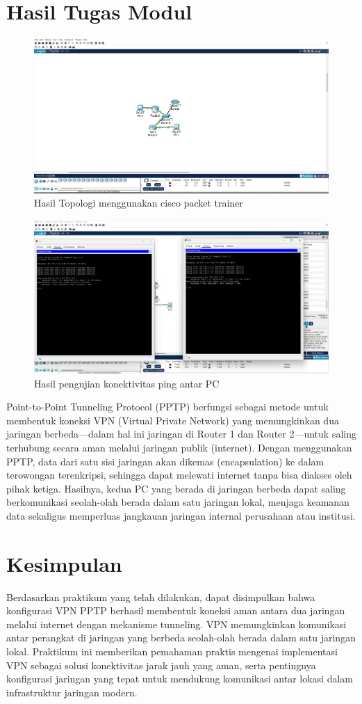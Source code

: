\section{Hasil Tugas Modul}

\begin{figure}[H]
        \centering
        \includegraphics[width=0.5\linewidth]{P1/img/18.png}
        \caption{Hasil Topologi menggunakan cisco packet trainer}
        \label{fig:gambar4}
    \end{figure}
    \begin{figure}[H]
        \centering
        \includegraphics[width=0.5\linewidth]{P1/img/19.png}
        \caption{Hasil pengujian konektivitas ping antar PC}
        \label{fig:gambar4}
    \end{figure}

Point-to-Point Tunneling Protocol (PPTP) berfungsi sebagai metode untuk membentuk koneksi VPN (Virtual Private Network) yang memungkinkan dua jaringan berbeda—dalam hal ini jaringan di Router 1 dan Router 2—untuk saling terhubung secara aman melalui jaringan publik (internet). Dengan menggunakan PPTP, data dari satu sisi jaringan akan dikemas (encapsulation) ke dalam terowongan terenkripsi, sehingga dapat melewati internet tanpa bisa diakses oleh pihak ketiga. Hasilnya, kedua PC yang berada di jaringan berbeda dapat saling berkomunikasi seolah-olah berada dalam satu jaringan lokal, menjaga keamanan data sekaligus memperluas jangkauan jaringan internal perusahaan atau institusi.

\section{Kesimpulan}
Berdasarkan praktikum yang telah dilakukan, dapat disimpulkan bahwa konfigurasi VPN PPTP berhasil membentuk koneksi aman antara dua jaringan melalui internet dengan mekanisme tunneling. VPN memungkinkan komunikasi antar perangkat di jaringan yang berbeda seolah-olah berada dalam satu jaringan lokal. Praktikum ini memberikan pemahaman praktis mengenai implementasi VPN sebagai solusi konektivitas jarak jauh yang aman, serta pentingnya konfigurasi jaringan yang tepat untuk mendukung komunikasi antar lokasi dalam infrastruktur jaringan modern.


